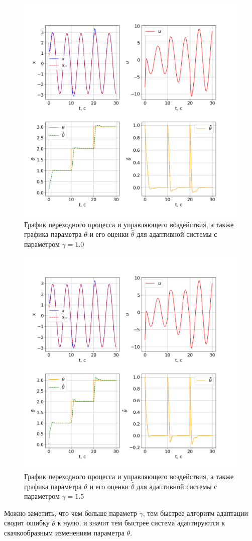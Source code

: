 \begin{figure}
    \centerline{\includegraphics[width=\linewidth]{images/task_2_1.0.png}}
    \caption{График переходного процесса и управляющего воздействия, а также графика параметра $\theta$ и его оценки $\hat{\theta}$ для адаптивной системы с параметром $\gamma = 1.0$}
    \label{24}
\end{figure}

\begin{figure}
    \centerline{\includegraphics[width=\linewidth]{images/task_2_1.5.png}}
    \caption{График переходного процесса и управляющего воздействия, а также графика параметра $\theta$ и его оценки $\hat{\theta}$ для адаптивной системы с параметром $\gamma = 1.5$}
    \label{25}
\end{figure}

Можно заметить, что чем больше параметр $\gamma$, тем быстрее алгоритм адаптации сводит ошибку $\tilde{\theta}$ к нулю, и значит тем быстрее система адаптируются к скачкообразным изменениям параметра $\theta$.
